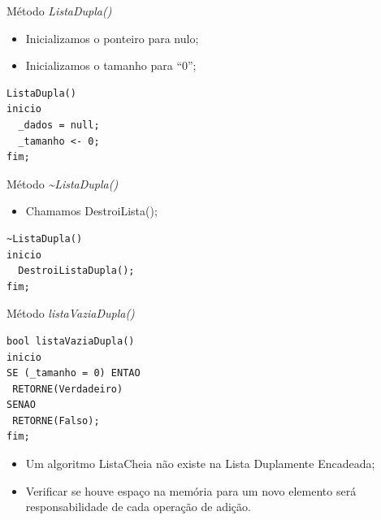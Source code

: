 \documentclass[12pt,table,xcolor={dvipsnames}]{beamer}
\begin{document}
\begin{frame}[fragile]{Método \textit{ListaDupla()}}

\begin{itemize}
\item Inicializamos o ponteiro para nulo;
\item Inicializamos o tamanho para ``0'';
\end{itemize}
\begin{lstlisting}
ListaDupla()
inicio
  _dados = null;
  _tamanho <- 0;
fim;
\end{lstlisting}
\end{frame}

\begin{frame}[fragile]{Método \textit{\~{}ListaDupla()}}

\begin{itemize}
\item Chamamos DestroiLista();
\end{itemize}
\begin{lstlisting}
~ListaDupla()
inicio
  DestroiListaDupla();
fim;
\end{lstlisting}
\end{frame}

\begin{frame}[fragile]{Método \textit{listaVaziaDupla()}}
\begin{lstlisting}
bool listaVaziaDupla()
inicio
SE (_tamanho = 0) ENTAO
 RETORNE(Verdadeiro)
SENAO
 RETORNE(Falso);
fim;
\end{lstlisting}
\begin{itemize}
\item Um algoritmo ListaCheia não existe na Lista Duplamente Encadeada;\pause
\item Verificar se houve espaço na memória para um novo elemento será responsabilidade de cada operação de adição.
\end{itemize}
\end{frame}
\end{document}
